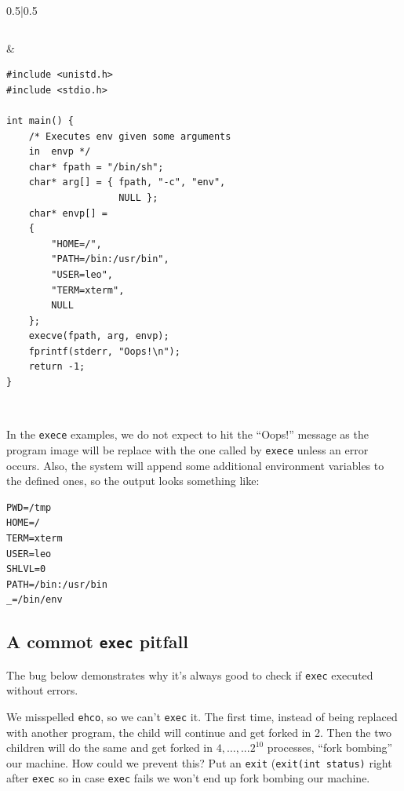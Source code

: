\documentclass[a4paper]{article}
\begin{document}
\begin{tabular}{0.5\textwidth|0.5\textwidth}
\begin{lstlisting}
\end{lstlisting}&
\begin{lstlisting}
#include <unistd.h>
#include <stdio.h>

int main() {
	/* Executes env given some arguments   
	in  envp */
	char* fpath = "/bin/sh";
    char* arg[] = { fpath, "-c", "env", 
                    NULL };
    char* envp[] =
    {
        "HOME=/",
        "PATH=/bin:/usr/bin",
		"USER=leo", 
		"TERM=xterm", 
       	NULL 
    };
    execve(fpath, arg, envp);
    fprintf(stderr, "Oops!\n");
    return -1;
}

\end{lstlisting}\\
\end{tabular} 
\lstset{style=code1}

In the \texttt{exece} examples, we do not expect to hit the ``Oops!'' message as the program image will be replace with the one called by \texttt{exece} unless an error occurs. Also, the system will append some additional environment variables to the defined ones, so the output looks something like:
\begin{verbatim}
PWD=/tmp
HOME=/
TERM=xterm
USER=leo
SHLVL=0
PATH=/bin:/usr/bin
_=/bin/env
\end{verbatim}


\subsection{A commot \texttt{exec} pitfall}

The bug below demonstrates why it's always good to check if \texttt{exec} executed without errors.
We misspelled \texttt{ehco}, so we can't \texttt{exec} it. The first time, instead of being replaced with another program, the child will continue and get forked in 2. Then the two children will do the same and get forked in $4,\ldots, ... 2^{10}$ processes, ``fork bombing'' our machine. How could we prevent this? Put an \texttt{exit} (\texttt{exit(int status)} right after \texttt{exec} so in case \texttt{exec} fails we won't end up fork bombing our machine.
\end{document}
